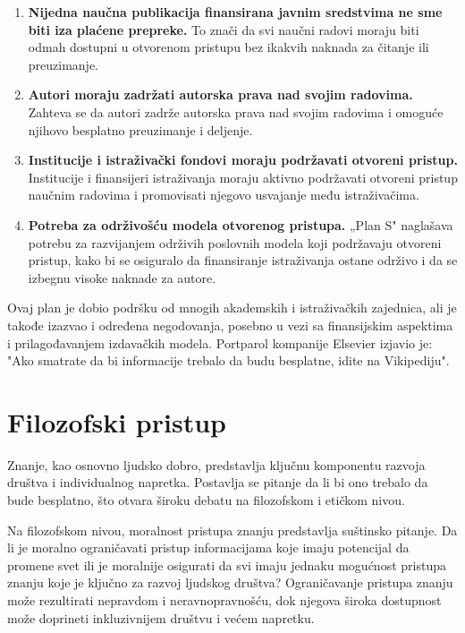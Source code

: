 \documentclass{article}
\begin{document}
\begin{enumerate}
    \item \textbf{Nijedna naučna publikacija finansirana javnim sredstvima ne sme biti iza plaćene prepreke.} To znači da svi naučni radovi moraju biti odmah dostupni u otvorenom pristupu bez ikakvih naknada za čitanje ili preuzimanje.
    \item \textbf{Autori moraju zadržati autorska prava nad svojim radovima.} Zahteva se da autori zadrže autorska prava nad svojim radovima i omoguće njihovo besplatno preuzimanje i deljenje.
    \item \textbf{Institucije i istraživački fondovi moraju podržavati otvoreni pristup.} Institucije i finansijeri istraživanja moraju aktivno podržavati otvoreni pristup naučnim radovima i promovisati njegovo usvajanje među istraživačima.
    \item \textbf{Potreba za održivošću modela otvorenog pristupa.} „Plan S" naglašava potrebu za razvijanjem održivih poslovnih modela koji podržavaju otvoreni pristup, kako bi se osiguralo da finansiranje istraživanja ostane održivo i da se izbegnu visoke naknade za autore.
\end{enumerate}

Ovaj plan je dobio podršku od mnogih akademskih i istraživačkih zajednica, ali je takođe izazvao i određena negodovanja, posebno u vezi sa finansijskim aspektima i prilagođavanjem izdavačkih modela. Portparol kompanije Elsevier izjavio je: "Ako smatrate da bi informacije trebalo da budu besplatne, idite na Vikipediju".



\section{Filozofski pristup}

Znanje, kao osnovno ljudsko dobro, predstavlja ključnu komponentu razvoja društva i individualnog napretka. Postavlja se pitanje da li bi ono trebalo da bude besplatno, što otvara široku debatu na filozofskom i etičkom nivou.

Na filozofskom nivou, moralnost pristupa znanju predstavlja suštinsko pitanje. Da li je moralno ograničavati pristup informacijama koje imaju potencijal da promene svet ili je moralnije osigurati da svi imaju jednaku mogućnost pristupa znanju koje je ključno za razvoj ljudskog društva? Ograničavanje pristupa znanju može rezultirati nepravdom i neravnopravnošću, dok njegova široka dostupnost može doprineti inkluzivnijem društvu i većem napretku. 
\end{document}
